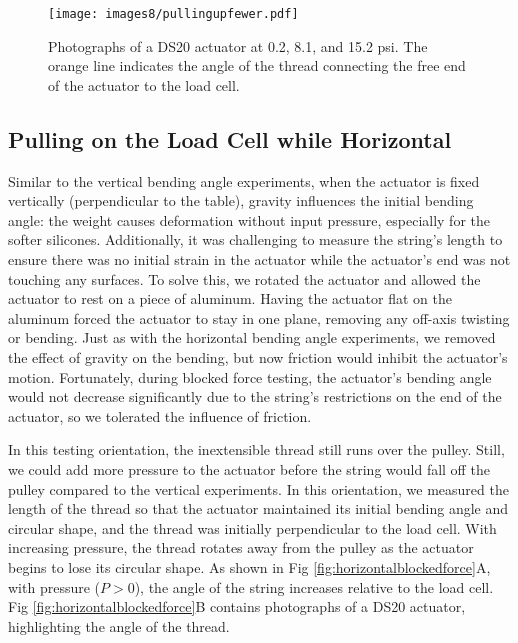 \begin{figure}[ht]
    \centering
     \texttt{[image: images8/pullingupfewer.pdf]}
    \caption{Photographs of a DS20 actuator at 0.2, 8.1, and 15.2 psi. The orange line indicates the angle of the thread connecting the free end of the actuator to the load cell.}
    \label{fig:verticalstringanglefewer}
\end{figure}

\clearpage
\subsection{Pulling on the Load Cell while Horizontal}

Similar to the vertical bending angle experiments, when the actuator is fixed vertically (perpendicular to the table), gravity influences the initial bending angle: the weight causes deformation without input pressure, especially for the softer silicones. Additionally, it was challenging to measure the string's length to ensure there was no initial strain in the actuator while the actuator's end was not touching any surfaces. To solve this, we rotated the actuator and allowed the actuator to rest on a piece of aluminum. Having the actuator flat on the aluminum forced the actuator to stay in one plane, removing any off-axis twisting or bending. Just as with the horizontal bending angle experiments, we removed the effect of gravity on the bending, but now friction would inhibit the actuator's motion. Fortunately, during blocked force testing, the actuator's bending angle would not decrease significantly due to the string's restrictions on the end of the actuator, so we tolerated the influence of friction. 

In this testing orientation, the inextensible thread still runs over the pulley. Still, we could add more pressure to the actuator before the string would fall off the pulley compared to the vertical experiments. In this orientation, we measured the length of the thread so that the actuator maintained its initial bending angle and circular shape, and the thread was initially perpendicular to the load cell. With increasing pressure, the thread rotates away from the pulley as the actuator begins to lose its circular shape. As shown in Fig \ref{fig:horizontalblockedforce}A, with pressure ($P > 0$), the angle of the string increases relative to the load cell. Fig \ref{fig:horizontalblockedforce}B contains photographs of a DS20 actuator, highlighting the angle of the thread. 

